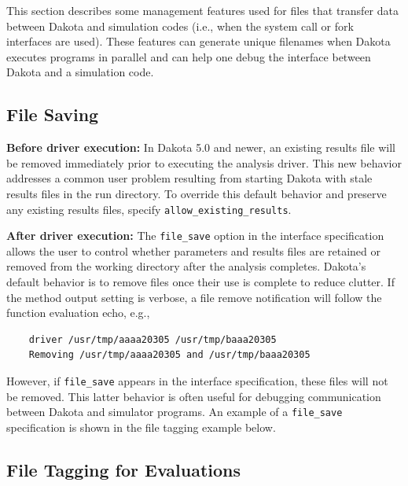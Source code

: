 This section describes some management features used for files that
transfer data between Dakota and simulation codes
(i.e., when the system call or fork interfaces are used). These
features can generate unique filenames when
Dakota executes programs in parallel and can help one debug
the interface between Dakota and a simulation code.

\subsection{File Saving}\label{interfaces:file:saving}

{\bf Before driver execution:} In Dakota 5.0 and newer, an existing
results file will be removed immediately prior to executing the
analysis driver.  This new behavior addresses a common user problem
resulting from starting Dakota with stale results files in the run
directory.  To override this default behavior and preserve any
existing results files, specify \texttt{allow\_existing\_results}.

{\bf After driver execution:} The \texttt{file\_save} option in the
interface specification allows the user to control whether parameters
and results files are retained or removed from the working directory
after the analysis completes. Dakota's default behavior is to remove
files once their use is complete to reduce clutter. If the method
output setting is verbose, a file remove notification will follow the
function evaluation echo, e.g.,
\begin{small}
\begin{verbatim}
    driver /usr/tmp/aaaa20305 /usr/tmp/baaa20305
    Removing /usr/tmp/aaaa20305 and /usr/tmp/baaa20305
\end{verbatim}
\end{small}

However, if \texttt{file\_save} appears in the interface
specification, these files will not be removed. This latter behavior
is often useful for debugging communication between Dakota and
simulator programs. An example of a \texttt{file\_save} specification
is shown in the file tagging example below.

\subsection{File Tagging for Evaluations}\label{interfaces:file:tagging1}

